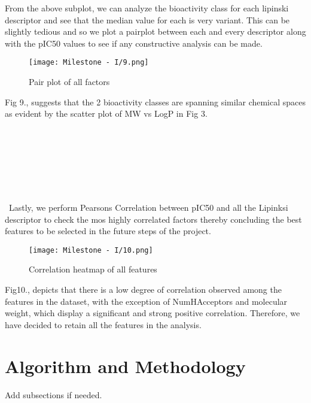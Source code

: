 \documentclass[fleqn,10pt]{SelfArx} %
\begin{document}
From the above subplot, we can analyze the bioactivity class for each lipinski descriptor and see that the median value for each is very variant. This can be slightly tedious and so we plot a pairplot between each and every descriptor along with the pIC50 values to see if any constructive analysis can be made. 

\begin{figure}[h!]
    \centering
    \texttt{[image: Milestone - I/9.png]}
    \caption{Pair plot of all factors}
    \label{fig:Pair plot of all factors}
\end{figure}

Fig 9., suggests that the 2 bioactivity classes are spanning similar chemical spaces as evident by the scatter plot of MW vs LogP in Fig 3.
\\\\\\\\\\\\\\\\\
Lastly, we perform Pearsons Correlation between pIC50 and all the Lipinksi descriptor to check the mos highly correlated factors thereby concluding the best features to be selected in the future steps of the project. 
\begin{figure}[h!]
    \centering
    \texttt{[image: Milestone - I/10.png]}
    \caption{Correlation heatmap of all features}
    \label{fig:Correlation heatmap of all features}
\end{figure}

Fig10., depicts that there is a low degree of correlation observed among the features in the dataset, with the exception of NumHAcceptors and molecular weight, which display a significant and strong positive correlation. Therefore, we have decided to retain all the features in the analysis.
\bigskip
\bigskip

\section{Algorithm and Methodology}

Add subsections if needed.

\bigskip
\bigskip
\end{document}
